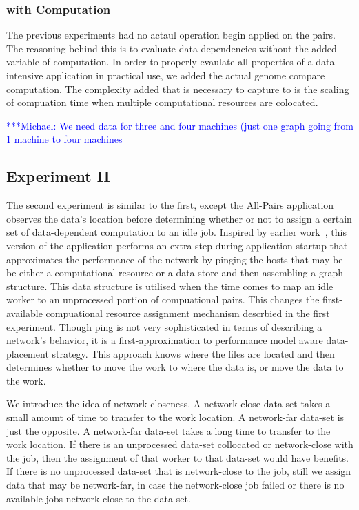 \documentclass{rspublic}
\newcommand{\micnote}[1]{ {\textcolor{blue} { ***Michael: #1 }}} \else
\newcommand{\jhanote}[1]{} \newcommand{\micnote}[1]{} \newcommand{\fixme}[1]{}
\begin{document}
\subsubsection{with Computation} The previous experiments had no actaul
operation begin applied on the pairs.  The reasoning behind this is to
evaluate data dependencies without the added variable of computation.
In order to properly evaulate all properties of a data-intensive
application in practical use, we added the actual genome compare
computation.  The complexity added that is necessary to capture to is
the scaling of compuation time when multiple computational resources are
colocated.

\jhanote{We need data for compute (comparision) and I/O (only) for
different data-set sizes} \micnote{We need data for three and four
machines (just one graph going from 1 machine to four machines}

\subsection{Experiment II} The second experiment is similar to the
first, except the All-Pairs application observes the data's location
before determining whether or not to assign a certain set of
data-dependent computation to an idle job.  Inspired by earlier
work~\citep{netperf}, this version of the application performs an extra
step during application startup that approximates the performance of the
network by pinging the hosts that may be be either a computational
resource or a data store and then  assembling a graph structure.  This
data structure is utilised when the time comes to map an idle worker to
an unprocessed portion of compuational pairs.  This changes the
first-available compuational resource assignment mechanism descrbied in
the first experiment.  Though ping is not very sophisticated in terms of
describing a network's behavior, it is a first-approximation to
performance model aware data-placement strategy.  This approach knows
where the files are located and then determines whether to move the work
to where the data is, or move the data to the work.  \jhanote{Data-aware
placement is also required, i.e., managing location of files.}  

We introduce the idea of network-closeness.  A network-close data-set
takes a small amount of time to transfer to the work location.  A
network-far data-set is just the opposite.  A network-far data-set takes
a long time to transfer to the work location.  If there is an
unprocessed data-set collocated or network-close with the job, then the
assignment of that worker to that data-set would have benefits.  If
there is no unprocessed data-set that is network-close to the job, still
we assign data that may be network-far, in case the network-close job
failed or there is no available jobs network-close to the data-set.
\end{document}
